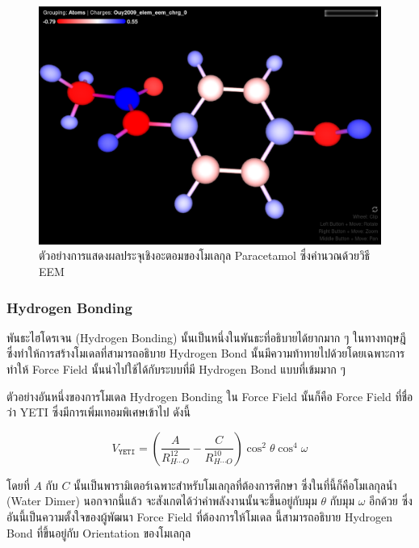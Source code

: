 \begin{figure}[htbp]
  \centering
  \includegraphics[width=0.8\linewidth]{fig/EEM-paracetamol.png}
  \caption{ตัวอย่างการแสดงผลประจุเชิงอะตอมของโมเลกุล Paracetamol ซึ่งคำนวณด้วยวิธี EEM}
  \label{fig:EEM_paracetamol}
\end{figure}

\subsubsection{Hydrogen Bonding}

พันธะไฮโดรเจน (Hydrogen Bonding) นั้นเป็นหนึ่งในพันธะที่อธิบายได้ยากมาก ๆ ในทางทฤษฎี ซึ่งทำให้การสร้างโมเดลที่สามารถอธิบาย Hydrogen
Bond นั้นมีความท้าทายไปด้วยโดยเฉพาะการทำให้ Force Field นั้นนำไปใช้ได้กับระบบที่มี Hydrogen Bond แบบที่เข้มมาก ๆ

ตัวอย่างอันหนึ่งของการโมเดล Hydrogen Bonding ใน Force Field นั้นก็คือ Force Field ที่ชื่อว่า YETI\autocite{vedani1988}
ซึ่งมีการเพิ่มเทอมพิเศษเข้าไป ดังนี้

\begin{equation}
  V_{\texttt{YETI}}
  =
  \left(
  \frac{A}{R^{12}_{H \cdots O}}
  - \frac{C}{R^{10}_{H \cdots O}}
  \right)
  \cos^{2} \theta
  \cos^{4} \omega
\end{equation}

\noindent โดยที่ $A$ กับ $C$ นั้นเป็นพารามิเตอร์เฉพาะสำหรับโมเลกุลที่ต้องการศึกษา ซึ่งในที่นี้ก็คือโมเลกุลน้ำ (Water Dimer) นอกจากนี้แล้ว%
จะสังเกตได้ว่าค่าพลังงานนั้นจะขึ้นอยู่กับมุม $\theta$ กับมุม $\omega$ อีกด้วย ซึ่งอันนี้เป็นความตั้งใจของผู้พัฒนา Force Field ที่ต้องการให้โมเดล%
นี้สามารถอธิบาย Hydrogen Bond ที่ขึ้นอยู่กับ Orientation ของโมเลกุล

